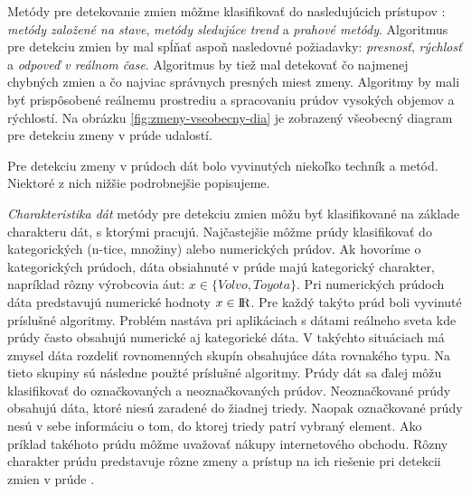  \par
Metódy pre detekovanie zmien môžme klasifikovať do nasledujúcich prístupov \citep{liu2010mining}: \textit{metódy založené na stave}, \textit{metódy sledujúce trend} a \textit{prahové metódy}. Algoritmus pre detekciu zmien by mal spĺňať aspoň nasledovné požiadavky: \textit{presnosť}, \textit{rýchlosť} a \textit{odpoveď v reálnom čase}. Algoritmus by tiež mal detekovať čo najmenej chybných zmien a čo najviac správnych presných miest zmeny. Algoritmy by mali byť prispôsobené reálnemu prostrediu a spracovaniu prúdov vysokých objemov a rýchlostí. Na obrázku \ref{fig:zmeny-vseobecny-dia} je zobrazený všeobecný diagram pre detekciu zmeny v prúde udalostí.

\label{fig:zmeny-vseobecny-dia}

Pre detekciu zmeny v prúdoch dát bolo vyvinutých niekoľko techník a metód. Niektoré z nich nižšie podrobnejšie popisujeme.

\textit{Charakteristika dát} metódy pre detekciu zmien môžu byť klasifikované na základe charakteru dát, s ktorými pracujú. Najčastejšie môžme prúdy klasifikovať do kategorických (n-tice, množiny) alebo numerických prúdov. Ak hovoríme o kategorických prúdoch, dáta obsiahnuté v prúde majú kategorický charakter, napríklad rôzny výrobcovia áut: $x \in \{Volvo, Toyota\}$. Pri numerických prúdoch dáta predstavujú numerické hodnoty $x \in {\rm I\!R}$. Pre každý takýto prúd boli vyvinuté príslušné algoritmy. Problém nastáva pri aplikáciach s dátami reálneho sveta kde prúdy často obsahujú numerické aj kategorické dáta. V takýchto situáciach má zmysel dáta rozdeliť rovnomenných skupín obsahujúce dáta rovnakého typu. Na tieto skupiny sú následne použté príslušné algoritmy. Prúdy dát sa ďalej môžu klasifikovať do označkovaných a neoznačkovaných prúdov. Neoznačkované prúdy obsahujú dáta, ktoré niesú zaradené do žiadnej triedy. Naopak označkované prúdy nesú v sebe informáciu o tom, do ktorej triedy patrí vybraný element. Ako príklad takéhoto prúdu môžme uvažovať nákupy internetového obchodu. Rôzny charakter prúdu predstavuje rôzne zmeny a prístup na ich riešenie pri detekcii zmien v prúde \citep{tran2014change}.

